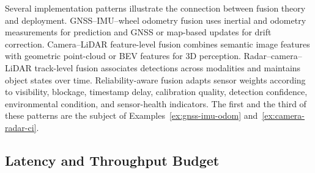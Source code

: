 Several implementation patterns illustrate the connection between fusion theory and deployment. GNSS--IMU--wheel odometry fusion uses inertial and odometry measurements for prediction and GNSS or map-based updates for drift correction. Camera--LiDAR feature-level fusion combines semantic image features with geometric point-cloud or BEV features for 3D perception. Radar--camera--LiDAR track-level fusion associates detections across modalities and maintains object states over time. Reliability-aware fusion adapts sensor weights according to visibility, blockage, timestamp delay, calibration quality, detection confidence, environmental condition, and sensor-health indicators. The first and the third of these patterns are the subject of Examples~\ref{ex:gnss-imu-odom} and~\ref{ex:camera-radar-ci}.

\subsection{Latency and Throughput Budget}
\label{subsec:latency}

